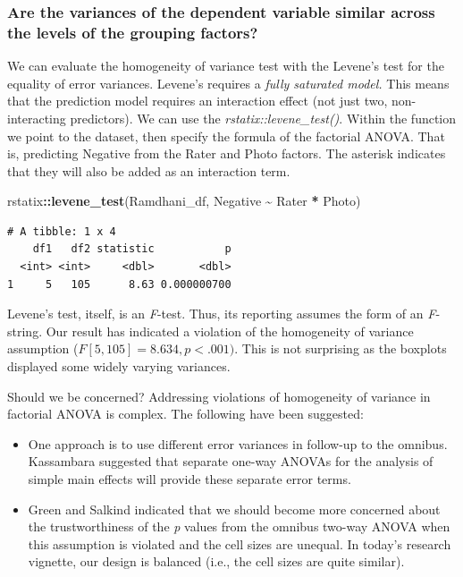 \documentclass[
  11pt,
]{book}
\newenvironment{Shaded}{\begin{snugshade}}{\end{snugshade}}
\newcommand{\FunctionTok}[1]{\textcolor[rgb]{0.27,0.27,0.27}{\textbf{#1}}}
\newcommand{\NormalTok}[1]{#1}
\newcommand{\SpecialCharTok}[1]{\textcolor[rgb]{0.43,0.43,0.43}{\textbf{#1}}}
\providecommand{\tightlist}{%
  \setlength{\itemsep}{0pt}\setlength{\parskip}{0pt}}
\begin{document}
\hypertarget{are-the-variances-of-the-dependent-variable-similar-across-the-levels-of-the-grouping-factors}{%
\subsubsection{Are the variances of the dependent variable similar across the levels of the grouping factors?}\label{are-the-variances-of-the-dependent-variable-similar-across-the-levels-of-the-grouping-factors}}

We can evaluate the homogeneity of variance test with the Levene's test for the equality of error variances. Levene's requires a \emph{fully saturated model.} This means that the prediction model requires an interaction effect (not just two, non-interacting predictors). We can use the \emph{rstatix::levene\_test()}. Within the function we point to the dataset, then specify the formula of the factorial ANOVA. That is, predicting Negative from the Rater and Photo factors. The asterisk indicates that they will also be added as an interaction term.

\begin{Shaded}
\begin{Highlighting}[]
\NormalTok{rstatix}\SpecialCharTok{::}\FunctionTok{levene\_test}\NormalTok{(Ramdhani\_df, Negative }\SpecialCharTok{\textasciitilde{}}\NormalTok{ Rater }\SpecialCharTok{*}\NormalTok{ Photo)}
\end{Highlighting}
\end{Shaded}

\begin{verbatim}
# A tibble: 1 x 4
    df1   df2 statistic           p
  <int> <int>     <dbl>       <dbl>
1     5   105      8.63 0.000000700
\end{verbatim}

Levene's test, itself, is an \emph{F}-test. Thus, its reporting assumes the form of an \emph{F}-string. Our result has indicated a violation of the homogeneity of variance assumption (\(F[5, 105] = 8.634, p < .001)\). This is not surprising as the boxplots displayed some widely varying variances.

Should we be concerned? Addressing violations of homogeneity of variance in factorial ANOVA is complex. The following have been suggested:

\begin{itemize}
\tightlist
\item
  One approach is to use different error variances in follow-up to the omnibus. Kassambara \citeyearpar{kassambara_anova_nodate} suggested that separate one-way ANOVAs for the analysis of simple main effects will provide these separate error terms.
\item
  Green and Salkind \citeyearpar{green_using_2017} indicated that we should become more concerned about the trustworthiness of the \emph{p} values from the omnibus two-way ANOVA when this assumption is violated and the cell sizes are unequal. In today's research vignette, our design is balanced (i.e., the cell sizes are quite similar).
\end{itemize}
\end{document}
